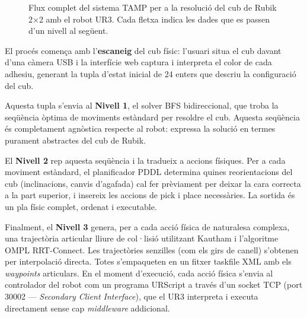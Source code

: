 \documentclass[12pt, a4paper]{article}
\begin{document}
\begin{figure}[H]
\caption{Flux complet del sistema TAMP per a la resolució del cub de Rubik 2$\times$2 amb el robot UR3. Cada fletxa indica les dades que es passen d'un nivell al següent.}
\label{fig:tamp_flow}
\end{figure}

El procés comença amb l'\textbf{escaneig} del cub físic: l'usuari situa el cub davant d'una càmera USB i la interfície web captura i interpreta el color de cada adhesiu, generant la tupla d'estat inicial de 24 enters que descriu la configuració del cub.

Aquesta tupla s'envia al \textbf{Nivell 1}, el solver BFS bidireccional, que troba la seqüència òptima de moviments estàndard per resoldre el cub. Aquesta seqüència és completament agnòstica respecte al robot: expressa la solució en termes purament abstractes del cub de Rubik.

El \textbf{Nivell 2} rep aquesta seqüència i la tradueix a accions físiques. Per a cada moviment estàndard, el planificador PDDL determina quines reorientacions del cub (inclinacions, canvis d'agafada) cal fer prèviament per deixar la cara correcta a la part superior, i insereix les accions de pick i place necessàries. La sortida és un pla físic complet, ordenat i executable.

Finalment, el \textbf{Nivell 3} genera, per a cada acció física de naturalesa complexa, una trajectòria articular lliure de col·lisió utilitzant Kautham i l'algoritme OMPL RRT-Connect. Les trajectòries senzilles (com els girs de canell) s'obtenen per interpolació directa. Totes s'empaqueten en un fitxer taskfile XML amb els \textit{waypoints} articulars. En el moment d'execució, cada acció física s'envia al controlador del robot com un programa URScript a través d'un socket TCP (port 30002 — \textit{Secondary Client Interface}), que el UR3 interpreta i executa directament sense cap \textit{middleware} addicional.
\newpage
\newpage
\end{document}
